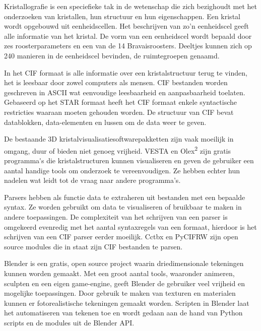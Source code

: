Kristallografie is een speciefieke tak in de wetenschap die zich bezighoudt met het onderzoeken van kristallen, hun structuur en hun eigenschappen. Een kristal wordt opgebouwd uit eenheidscellen. Het beschrijven van zo'n eenheidscel geeft alle informatie van het kristal. De vorm van een eenheidscel wordt bepaald door zes roosterparameters en een van de 14 Bravaisroosters. Deeltjes kunnen zich op 240 manieren in de eenheidscel bevinden, de ruimtegroepen genaamd.
\par
In het CIF formaat is alle informatie over een kristalstructuur terug te vinden, het is leesbaar door zowel computers als mensen. CIF bestanden worden geschreven in ASCII wat eenvoudige leesbaarheid en aanpasbaarheid toelaten. Gebaseerd op het STAR formaat heeft het CIF formaat enkele syntactische restricties waaraan moeten gehouden worden. De structuur van CIF bevat datablokken, data-elementen en lussen om de data weer te geven.
\par
De bestaande 3D kristalvisualisatiesoftwarepakketten zijn vaak moeilijk in omgang, duur of bieden niet genoeg vrijheid. VESTA en Olex\textsuperscript{2} zijn gratis programma\'{}s die kristalstructuren kunnen visualiseren en geven de gebruiker een aantal handige tools om onderzoek te vereenvoudigen. Ze hebben echter hun nadelen wat leidt tot de vraag naar andere programma's.
\par
Parsers hebben als functie data te extraheren uit bestanden met een bepaalde syntax. Ze worden gebruikt om data te visualiseren of bruikbaar te maken in andere toepassingen. De complexiteit van het schrijven van een parser is omgekeerd evenredig met het aantal syntaxregels van een formaat, hierdoor is het schrijven van een CIF parser eerder moeilijk. Cctbx en PyCIFRW zijn open source modules die in staat zijn CIF bestanden te parsen.
\par
Blender is een gratis, open source project waarin driedimensionale tekeningen kunnen worden gemaakt. Met een groot aantal tools, waaronder animeren, sculpten en een eigen game-engine, geeft Blender de gebruiker veel vrijheid en mogelijke toepassingen. Door gebruik te maken van texturen en materialen kunnen er fotorealistische tekeningen gemaakt worden. Scripten in Blender laat het automatiseren van tekenen toe en wordt gedaan aan de hand van Python scripts en de modules uit de Blender API.   